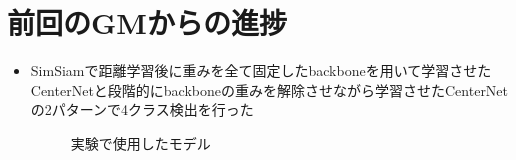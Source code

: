\documentclass[a4j]{ujarticle}
\begin{document}
\clearpage

    \section{前回のGMからの進捗}
        \begin{itemize}
            \item SimSiam\cite{simsiam}で距離学習後に重みを全て固定したbackboneを用いて学習させたCenterNet\cite{centernet}と段階的にbackboneの重みを解除させながら学習させたCenterNet\cite{centernet}の2パターンで4クラス検出を行った

            \begin{figure}[!h]
                \centering
                \caption{実験で使用したモデル}
            \end{figure}


\end{itemize}
\end{document}

